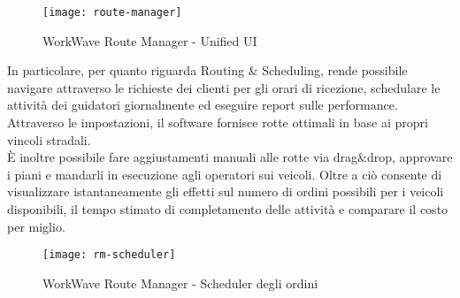 \begin{figure}[H] 
  \centering 
  \texttt{[image: route-manager]} 
  \caption{WorkWave Route Manager - Unified UI}
\end{figure}

In particolare, per quanto riguarda Routing \& Scheduling, rende possibile navigare attraverso le richieste dei clienti per gli orari di ricezione, schedulare le attività dei guidatori giornalmente ed eseguire report sulle performance. Attraverso le impostazioni, il software fornisce rotte ottimali in base ai propri vincoli stradali. \\

È inoltre possibile fare aggiustamenti manuali alle rotte via drag\&drop, approvare i piani e mandarli in esecuzione agli operatori sui veicoli. Oltre a ciò consente di visualizzare istantaneamente gli effetti sul numero di ordini possibili per i veicoli disponibili, il tempo stimato di completamento delle attività e comparare il costo per miglio.

\begin{figure}[H] 
  \centering 
  \texttt{[image: rm-scheduler]} 
  \caption{WorkWave Route Manager - Scheduler degli ordini}
\end{figure}
